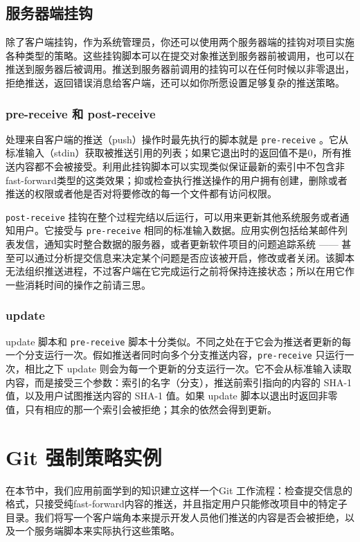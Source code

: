\documentclass[a4paper]{book}
\begin{document}
\subsection{服务器端挂钩}

除了客户端挂钩，作为系统管理员，你还可以使用两个服务器端的挂钩对项目实施各种类型的策略。这些挂钩脚本可以在提交对象推送到服务器前被调用，也可以在推送到服务器后被调用。推送到服务器前调用的挂钩可以在任何时候以非零退出，拒绝推送，返回错误消息给客户端，还可以如你所愿设置足够复杂的推送策略。

\subsubsection{pre-receive 和 post-receive}

处理来自客户端的推送（push）操作时最先执行的脚本就是 \texttt{pre-receive} 。它从标准输入（stdin）获取被推送引用的列表；如果它退出时的返回值不是0，所有推送内容都不会被接受。利用此挂钩脚本可以实现类似保证最新的索引中不包含非fast-forward类型的这类效果；抑或检查执行推送操作的用户拥有创建，删除或者推送的权限或者他是否对将要修改的每一个文件都有访问权限。

\texttt{post-receive} 挂钩在整个过程完结以后运行，可以用来更新其他系统服务或者通知用户。它接受与 \texttt{pre-receive} 相同的标准输入数据。应用实例包括给某邮件列表发信，通知实时整合数据的服务器，或者更新软件项目的问题追踪系统 ------ 甚至可以通过分析提交信息来决定某个问题是否应该被开启，修改或者关闭。该脚本无法组织推送进程，不过客户端在它完成运行之前将保持连接状态；所以在用它作一些消耗时间的操作之前请三思。

\subsubsection{update}

update 脚本和 \texttt{pre-receive} 脚本十分类似。不同之处在于它会为推送者更新的每一个分支运行一次。假如推送者同时向多个分支推送内容，\texttt{pre-receive} 只运行一次，相比之下 update 则会为每一个更新的分支运行一次。它不会从标准输入读取内容，而是接受三个参数：索引的名字（分支），推送前索引指向的内容的 SHA-1 值，以及用户试图推送内容的 SHA-1 值。如果 update 脚本以退出时返回非零值，只有相应的那一个索引会被拒绝；其余的依然会得到更新。

\section{Git 强制策略实例}

在本节中，我们应用前面学到的知识建立这样一个Git 工作流程：检查提交信息的格式，只接受纯fast-forward内容的推送，并且指定用户只能修改项目中的特定子目录。我们将写一个客户端角本来提示开发人员他们推送的内容是否会被拒绝，以及一个服务端脚本来实际执行这些策略。
\end{document}
